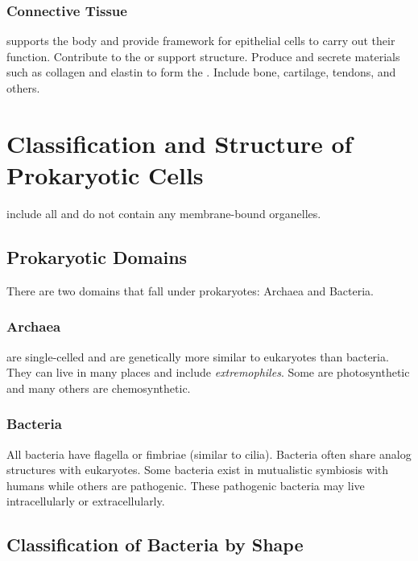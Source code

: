 \documentclass[../Bio_chemistryReview.tex]{subfiles}
\begin{document}
\subsubsection{Connective Tissue\supdag}

 supports the body and provide framework for epithelial
cells to carry out their function. Contribute to the  or support
structure. Produce and secrete materials such as collagen and elastin to form
the . Include bone, cartilage, tendons, and others.

\section{Classification and Structure of Prokaryotic Cells\supdag}

 include all  and do not contain any
membrane-bound organelles.

\subsection{Prokaryotic Domains\supdag}

There are two domains that fall under prokaryotes: Archaea and Bacteria.

\subsubsection{Archaea\supdag}

 are single-celled and are genetically more similar to eukaryotes
than bacteria. They can live in many places and include \emph{extremophiles}.
Some are photosynthetic and many others are chemosynthetic.

\subsubsection{Bacteria\supdag}

All bacteria have flagella or fimbriae (similar to cilia). Bacteria often share
analog structures with eukaryotes. Some bacteria exist in mutualistic symbiosis
with humans while others are pathogenic. These pathogenic bacteria may live
intracellularly or extracellularly.

\subsection{Classification of Bacteria by Shape\supdag}
\end{document}
